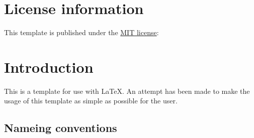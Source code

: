 

\section{License information}

This template is published under the \href{https://opensource.org/licenses/mit-license.php}{MIT license}:

\begin{figure}[H]
    \scriptsize
\end{figure}

\section{Introduction}

This is a template for use with \LaTeX{}. An attempt has been made to make
the usage of this template as simple as possible for the user.

\subsection{Nameing conventions}


